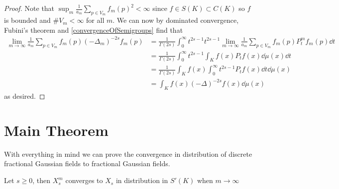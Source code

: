 \begin{proof}
	Note that $\sup_{m} \frac{1}{a_m} \sum_{p \in V_m} f_m(p)^2 < \infty$ since $f \in S(K) \subset C(K)$ so $f$ is bounded and $\# V_m < \infty$ for all $m$. We can now by dominated convergence, Fubini's theorem and \cref{convergenceOfSemigroups} find that 
	\begin{align}
		\lim_{m \to \infty} \frac{1}{a_m} \sum_{p \in V_m} f_m(p) (-\Delta_{m})^{-2s} f_m(p) &= \frac{1}{\Gamma(2s)} \int_{0}^{\infty} t^{2s-1} t^{2s-1} \lim_{m \to \infty}\frac{1}{a_m} \sum_{p \in V_m} f_m(p) P_{t}^{m} f_m(p) \dd t \\
		&= \frac{1}{\Gamma(2s)} \int_{0}^{\infty} t^{2s-1} \int_{K} f(x) P_t f(x) \dd\mu(x) \dd t \\
		&= \frac{1}{\Gamma(2s)} \int_{K} f(x) \int_{0}^{\infty} t^{2s-1}P_t f(x) \dd t \dd\mu(x) \\
		&= \int_{K} f(x) (-\Delta)^{-2s}f(x) \dd \mu(x)
	\end{align}
	as desired.
\end{proof}


\section{Main Theorem}
With everything in mind we can prove the convergence in distribution of discrete fractional Gaussian fields to fractional Gaussian fields.

\begin{theorem}
	Let $s \geq 0$, then $X_{s}^{m}$ converges to $X_s$ in distribution in $S'(K)$ when $m \to \infty$
\end{theorem}

